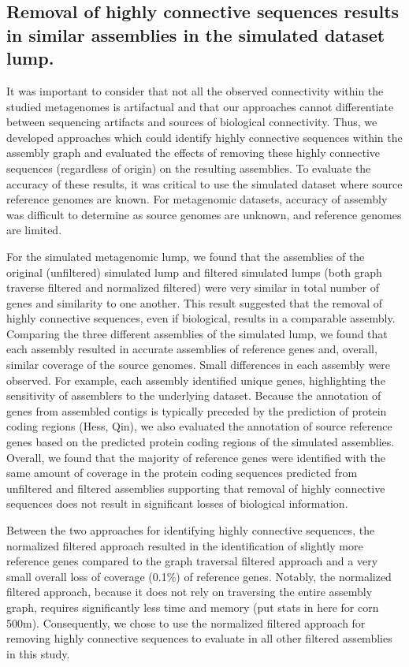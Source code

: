 \documentclass[11pt]{article} %
\begin{document}
\subsection{Removal of highly connective sequences results in similar assemblies in the simulated dataset lump.}

It was important to consider that not all the observed connectivity within the studied metagenomes is artifactual and that our approaches cannot differentiate between sequencing artifacts and sources of biological connectivity.  Thus, we developed approaches which could identify highly connective sequences within the assembly graph and evaluated the effects of removing these highly connective sequences (regardless of origin) on the resulting assemblies.  To evaluate the accuracy of these results, it was critical to use the simulated dataset where source reference genomes are known.  For metagenomic datasets, accuracy of assembly was difficult to determine as source genomes are unknown, and reference genomes are limited.

For the simulated metagenomic lump, we found that the assemblies of the original (unfiltered) simulated lump and filtered simulated lumps (both graph traverse filtered and normalized filtered) were very similar in total number of genes and similarity to one another.  This result suggested that the removal of highly connective sequences, even if biological, results in a comparable assembly.  Comparing the three different assemblies of the simulated lump, we found that each assembly resulted in accurate assemblies of reference genes and, overall, similar coverage of the source genomes.  Small differences in each assembly were observed.  For example, each assembly identified unique genes, highlighting the sensitivity of assemblers to the underlying dataset.  Because the annotation of genes from assembled contigs is typically preceded by the prediction of protein coding regions (Hess, Qin), we also evaluated the annotation of source reference genes based on the predicted protein coding regions of the simulated assemblies.  Overall, we found that the majority of reference genes were identified with the same amount of coverage in the protein coding sequences predicted from unfiltered and filtered assemblies supporting that removal of highly connective sequences does not result in significant losses of biological information.  

Between the two approaches for identifying highly connective sequences, the normalized filtered approach resulted in the identification of slightly more reference genes compared to the graph traversal filtered approach and a very small overall loss of coverage (0.1\%) of reference genes.  Notably, the normalized filtered approach, because it does not rely on traversing the entire assembly graph, requires significantly less time and memory (put stats in here for corn 500m).  Consequently, we chose to use the normalized filtered approach for removing highly connective sequences to evaluate in all other filtered assemblies in this study.  
\end{document}
